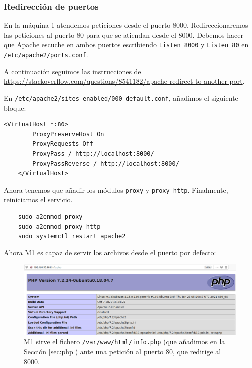 \documentclass{article}
\begin{document}
\subsubsection{Redirección de puertos}

En la máquina 1 atendemos peticiones desde el puerto 8000. Redireccionaremos las peticiones al puerto 80 para que se atiendan desde el
8000. Debemos hacer que Apache escuche en ambos puertos escribiendo \texttt{Listen 8000} y \texttt{Listen 80} en
 \texttt{/etc/apache2/ports.conf}.

A continuación seguimos las instrucciones de \\ \href{https://stackoverflow.com/questions/8541182/apache-redirect-to-another-port}
{https://stackoverflow.com/questions/8541182/apache-redirect-to-another-port}.

En \texttt{/etc/apache2/sites-enabled/000-default.conf}, añadimos el siguiente bloque:

\begin{Verbatim}[tabsize=4]
	<VirtualHost *:80>
		ProxyPreserveHost On
		ProxyRequests Off
		ProxyPass / http://localhost:8000/
		ProxyPassReverse / http://localhost:8000/
	</VirtualHost>
\end{Verbatim}

Ahora tenemos que añadir los módulos \texttt{proxy} y \texttt{proxy\_http}. Finalmente, reiniciamos el servicio.

\begin{verbatim}
	sudo a2enmod proxy
	sudo a2enmod proxy_http
	sudo systemctl restart apache2
\end{verbatim}

Ahora M1 es capaz de servir los archivos desde el puerto por defecto:

\begin{figure}[H]
	\centering
	\includegraphics[width=160mm]{imgs/port-redirection}
	\caption{M1 sirve el fichero \texttt{/var/www/html/info.php} (que añadimos en la Sección \ref{sec:php}) ante una petición al puerto 80,
		 que redirige al 8000.}
	\label{fig:port-redirection}
\end{figure}
\end{document}

